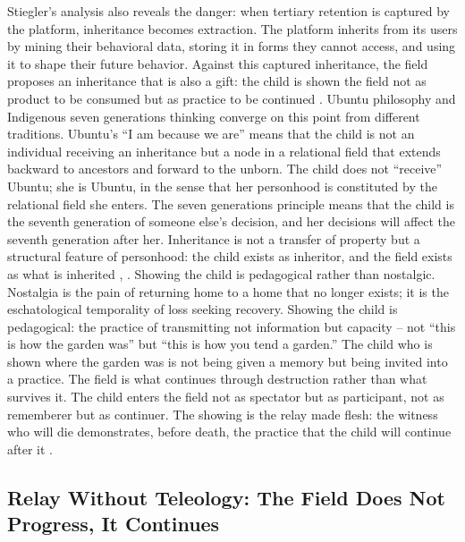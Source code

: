 Stiegler’s analysis also reveals the danger: when tertiary retention is captured by the platform, inheritance becomes extraction. The platform inherits from its users by mining their behavioral data, storing it in forms they cannot access, and using it to shape their future behavior. Against this captured inheritance, the field proposes an inheritance that is also a gift: the child is shown the field not as product to be consumed but as practice to be continued \cite[pp.~245-278]{stiegler_1994}. Ubuntu philosophy and Indigenous seven generations thinking converge on this point from different traditions. Ubuntu’s “I am because we are” means that the child is not an individual receiving an inheritance but a node in a relational field that extends backward to ancestors and forward to the unborn. The child does not “receive” Ubuntu; she is Ubuntu, in the sense that her personhood is constituted by the relational field she enters. The seven generations principle means that the child is the seventh generation of someone else’s decision, and her decisions will affect the seventh generation after her. Inheritance is not a transfer of property but a structural feature of personhood: the child exists as inheritor, and the field exists as what is inherited \cite{tutu_1999}, \cite{kimmerer_2013}. Showing the child is pedagogical rather than nostalgic. Nostalgia is the pain of returning home to a home that no longer exists; it is the eschatological temporality of loss seeking recovery. Showing the child is pedagogical: the practice of transmitting not information but capacity – not “this is how the garden was” but “this is how you tend a garden.” The child who is shown where the garden was is not being given a memory but being invited into a practice. The field is what continues through destruction rather than what survives it. The child enters the field not as spectator but as participant, not as rememberer but as continuer. The showing is the relay made flesh: the witness who will die demonstrates, before death, the practice that the child will continue after it \cite{agamben_2013}.

\subsection{Relay Without Teleology: The Field Does Not Progress, It Continues}

